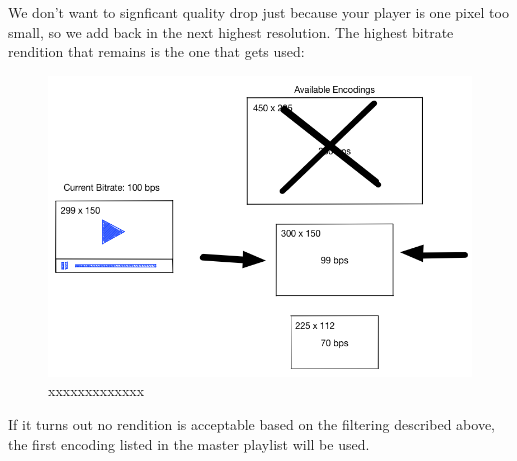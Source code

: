 We don't want to signficant quality drop just because your player is one pixel too small, so we add back in the next highest resolution. The highest bitrate rendition that remains is the one that gets used:


\begin{figure}[htb] %
 \centering
 \includegraphics[width=1.0\linewidth]{images/chapter4/bitrate-switching-4.png}\hfill
 \caption[xxxxxxxxx]{xxxxxxxxxxxxx}
 \label{fig:fourV}
\end{figure}


If it turns out no rendition is acceptable based on the filtering described above, the first encoding listed in the master playlist will be used.


\newpage
